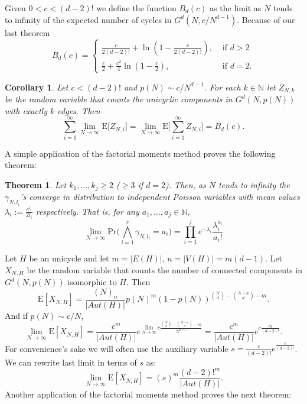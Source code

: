\documentclass[11pt,notitlepage,a4paper]{article}
\newtheorem{theorem}{Theorem}[section]
\newtheorem{corollary}{Corollary}[section]
\theoremstyle{definition}
\newcommand{\N}{\mathbb{N}}
\newcommand{\LN}{\lim\limits_{N\to \infty}}
\begin{document}
	Given $0<c<(d-2)!$ we define the function $B_d(c)$ as 
	the limit as $N$ tends to infinity of the expected number of
	cycles in $G^d(N,c/N^{d-1})$. Because of our last theorem
	\[
	B_d(c)=\begin{cases}
	\frac{c}{2(d-2)!}+ \ln\left(1-\frac{c}{2(d-2)!}\right)
	,& \text{ if } d>2\\	
	\frac{c}{2}+ \frac{c^2}{4} \ln\left(1-\frac{c}{2}\right)
	, &\text{ if } d=2.
	\end{cases}
	\]
	
	\begin{corollary} \label{thm:limitchangeunicycles}
		Let $c<(d-2)!$ and $p(N)\sim c/N^{d-1}$. For each $k\in \N$ let 
		$Z_{N,k}$ be the random variable that counts the
		unicyclic components in $G^d(N,p(N))$ with exactly $k$ edges. 
		Then 
		\[
		\sum_{i=1}^\infty \LN \mathrm{E}\big[ Z_{N,i} \big]
		=  \LN \mathrm{E}\big[\sum_{i=1}^\infty Z_{N,i} \big]	
		= B_d(c).	
		\]
	\end{corollary}
	A simple application of the factorial moments method proves the following
	theorem:
	\begin{theorem} \label{thm:probcycles} 
		Let $k_1,\dots,k_j\geq 2$ ($\geq 3$ if $d=2$). Then, 
		as $N$ tends to infinity the $\gamma_{N,l_i}$'s converge 
		in distribution to independent Poisson variables
		with mean values $\lambda_i:=\frac{c^{l_i}}{2l_i}$ respectively.
		That is, for any $a_1,\dots,a_j\in \N$,
		\[
		\LN \mathrm{Pr}\Big(
		\bigwedge_{i=1}^r
		\gamma_{N,l_i}=a_i		
		\Big)= \prod_{i=1}^{j} e^{-\lambda_i}\frac{\lambda_i^{a_i}}{a_i!}
		\]
	\end{theorem}
	
	
	Let $H$ be an unicycle and let $m=|E(H)|$, $n=|V(H)|=m(d-1)$. 
	Let $X_{N,H}$ be the random variable that counts
	the number of connected components in $G^d(N,p(N))$ isomorphic to $H$. Then
	\[ 
	\mathrm{E}[X_{N,H}]= \frac{(N)_n}{|Aut(H)|}
	p(N)^{m}(1-p(N))^{\binom{N}{d}-\binom{N-n}{d} - m}.
	\]
	And if $p(N)\sim c/N$,
	\[
	\LN \mathrm{E}[X_{N,H}]=  \frac{c^m}{|Aut(H)|}
	e^{\LN c\frac{\binom{N}{d}-\binom{N-n}{d} - m}{N^{d-1}}}
	=  \frac{c^m}{|Aut(H)|}
	e^{c\frac{m}{(d-2)!}}.
	\]	
	For convenience's sake we will often use the auxiliary variable
	$s=\frac{c}{(d-2)!}e^{\frac{c}{(d-2)!}}$. We can rewrite last 
	limit in terms of $s$ as:
	\[
	\LN \mathrm{E}[X_{N,H}]=(s)^m
	\frac{(d-2)!^m}{|Aut(H)|}.	
	\]
	Another application of the factorial moments method proves the next theorem:
\end{document}
